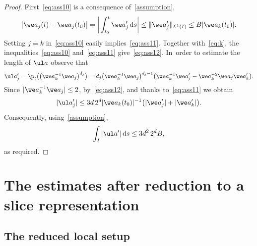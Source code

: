 \begin{proof}
 First~\eqref{eq:ass10} is a consequence of~\eqref{assumption},
 \begin{gather*}
 \big|\we a_j (t) - \we a_j (t_0)\big| = \bigg|\int_{t_0}^t \we a_j' \,{\rm d}s\bigg|
 \le \| \we a_j'\|_{L^1(I)} \le B |\we a_k(t_0)|.
 \end{gather*}
 Setting $j=k$ in~\eqref{eq:ass10} easily implies~\eqref{eq:ass11}. Together with~\eqref{eq:k}, the inequalities~\eqref{eq:ass10} and~\eqref{eq:ass11} give~\eqref{eq:ass12}. In~order to estimate the length of $\ul a$ observe that
 \begin{gather*}
 \ul a_j' = \p_t \big(\big(\we a_k^{-1} \we a_j\big)^{d_j} \big) = d_j \big(\we a_k^{-1} \we a_j\big)^{d_j-1} \big(\we a_k^{-1} \we a_j'
 - \we a_k^{-2} \we a_j \we a_k' \big).
 \end{gather*}
 Since $|\we a_k^{-1} \we a_j| \le 2$, by~\eqref{eq:ass12}, and thanks to~\eqref{eq:ass11} we obtain
 \begin{gather*}
 |\ul a_j'| \le 3 d\, 2^{d} |\we a_k(t_0)|^{-1} \big( |\we a_j'| + |\we a_k'|\big).
 \end{gather*}
 Consequently, using~\eqref{assumption},
 \begin{gather*}
 \int_I |\ul a'| \,{\rm d}s \le 3 d^2\, 2^{d} B,
 \end{gather*}
 as required.
\end{proof}





\section{The estimates after reduction to a slice representation} %



\subsection{The reduced local setup}

